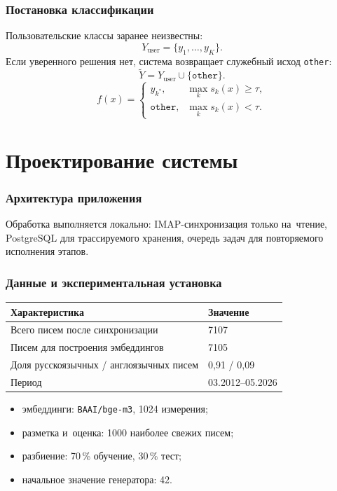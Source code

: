 \begin{frame}
    \frametitle{Постановка классификации}
        \small
        Пользовательские классы заранее неизвестны:
        \[
            Y_{\text{user}}=\{y_1,\dots,y_K\}.
        \]
        Если уверенного решения нет, система возвращает служебный исход
        \texttt{other}:
        \[
            \widetilde{Y}=Y_{\text{user}}\cup\{\texttt{other}\}.
        \]
        \[
            f(x)=
            \begin{cases}
                y_{k^*}, & \max_k s_k(x)\geqslant\tau,\\
                \texttt{other}, & \max_k s_k(x)<\tau.
            \end{cases}
        \]
\end{frame}

\section{Проектирование системы}

\begin{frame}
    \frametitle{Архитектура приложения}
    \centering
    \resizebox{0.98\linewidth}{!}{}

    \medskip
    \small
    Обработка выполняется локально: IMAP-синхронизация только на~чтение,
    PostgreSQL для трассируемого хранения, очередь задач для повторяемого
    исполнения этапов.
\end{frame}

\begin{frame}
    \frametitle{Данные и экспериментальная установка}
    \centering
    \small
    \begin{tabular}{@{}ll@{}}
        \toprule
        Характеристика & Значение \\
        \midrule
        Всего писем после синхронизации & 7107 \\
        Писем для построения эмбеддингов & 7105 \\
        Доля русскоязычных / англоязычных писем & 0{,}91 / 0{,}09 \\
        Период & 03.2012--05.2026 \\
        \bottomrule
    \end{tabular}

    \medskip
    \begin{itemize}
        \item эмбеддинги: \texttt{BAAI/bge-m3}, 1024 измерения;
        \item разметка и~оценка: 1000 наиболее свежих писем;
        \item разбиение: 70\,\% обучение, 30\,\% тест;
        \item начальное значение генератора: 42.
    \end{itemize}
\end{frame}

